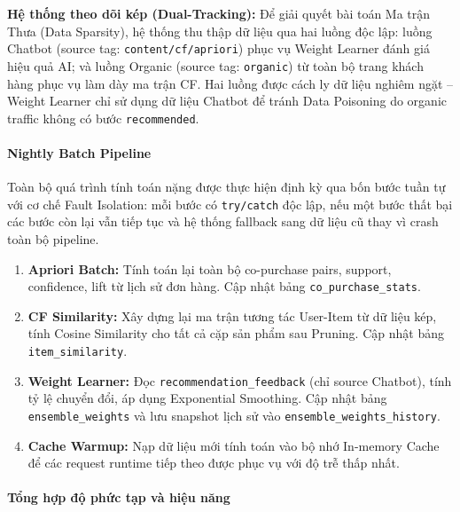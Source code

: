 \documentclass[12pt,a4paper]{report}
\begin{document}
\textbf{Hệ thống theo dõi kép (Dual-Tracking):} Để giải quyết bài toán Ma trận Thưa (Data Sparsity), hệ thống thu thập dữ liệu qua hai luồng độc lập: luồng Chatbot (source tag: \texttt{content/cf/apriori}) phục vụ Weight Learner đánh giá hiệu quả AI; và luồng Organic (source tag: \texttt{organic}) từ toàn bộ trang khách hàng phục vụ làm dày ma trận CF. Hai luồng được cách ly dữ liệu nghiêm ngặt -- Weight Learner chỉ sử dụng dữ liệu Chatbot để tránh Data Poisoning do organic traffic không có bước \texttt{recommended}.
 
\paragraph{Nightly Batch Pipeline}
 
Toàn bộ quá trình tính toán nặng được thực hiện định kỳ qua bốn bước tuần tự với cơ chế Fault Isolation: mỗi bước có \texttt{try/catch} độc lập, nếu một bước thất bại các bước còn lại vẫn tiếp tục và hệ thống fallback sang dữ liệu cũ thay vì crash toàn bộ pipeline.
 
\begin{enumerate}
    \item \textbf{Apriori Batch:} Tính toán lại toàn bộ co-purchase pairs, support, confidence, lift từ lịch sử đơn hàng. Cập nhật bảng \texttt{co\_purchase\_stats}.
    \item \textbf{CF Similarity:} Xây dựng lại ma trận tương tác User-Item từ dữ liệu kép, tính Cosine Similarity cho tất cả cặp sản phẩm sau Pruning. Cập nhật bảng \texttt{item\_similarity}.
    \item \textbf{Weight Learner:} Đọc \texttt{recommendation\_feedback} (chỉ source Chatbot), tính tỷ lệ chuyển đổi, áp dụng Exponential Smoothing. Cập nhật bảng \texttt{ensemble\_weights} và lưu snapshot lịch sử vào \texttt{ensemble\_weights\_history}.
    \item \textbf{Cache Warmup:} Nạp dữ liệu mới tính toán vào bộ nhớ In-memory Cache để các request runtime tiếp theo được phục vụ với độ trễ thấp nhất.
\end{enumerate}
 
\paragraph{Tổng hợp độ phức tạp và hiệu năng}
 
\end{document}
